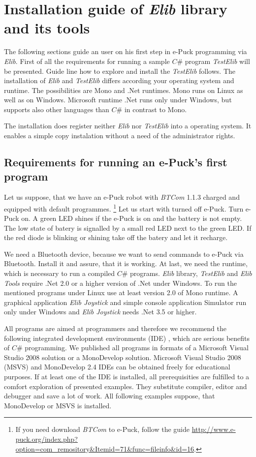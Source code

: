   \chapter{Installation guide of {\it Elib} library and its tools} 
  \label{app:installelib}
    The following sections guide an user on his first step in e-Puck programming via {\it Elib}.
    First of all the requirements for running a sample $C\#$ program {\it TestElib} will be presented.
    Guide line how to explore and install the {\it TestElib} follows.
    The installation of {\it Elib} and {\it TestElib} differs according your operating system and runtime.
    The possibilities are Mono\cite{mono} and .Net runtimes. Mono runs on Linux as well as on Windows. Microsoft runtime .Net
    runs only under Windows, but supports also other languages than $C\#$ in contrast to Mono.

    The installation does register neither {\it Elib} nor {\it TestElib} into a operating system. It enables
    a simple copy instalation without a need of the administrator rights.
  \section{Requirements for running an e-Puck's first program}
  \label{sec:require}
  Let us suppose, that we have an e-Puck robot with {\it BTCom} 1.1.3 charged and equipped with default programmes.
  \footnote{\small{If you need download {\it BTCom} to e-Puck, follow the guide 
  \url{http://www.e-puck.org/index.php?option=com_remository&Itemid=71&func=fileinfo&id=16}.}}
  Let us start with turned off e-Puck. Turn e-Puck on.
  A green LED shines if the e-Puck is on and the battery is not empty.
  The low state of batery is signalled by a small red LED next to the green LED. 
  If the red diode is blinking or shining take off the batery and let it recharge.


  We need a Bluetooth device, because we want to send commands to e-Puck via Bluetooth. Install it and assure,
  that it is working.
  At last, we need the runtime, which is necessary to run a compiled $C\#$ programs. 
  {\it Elib} library, {\it TestElib} and {\it Elib Tools} require .Net 2.0 or a higher version of .Net under Windows.
  To run the mentioned programs under Linux use at least version 2.0 of Mono runtime.
  A graphical application {\it Elib Joystick} and simple console application Simulator
  run only under Windows and {\it Elib Joystick} needs .Net 3.5 or higher.

  All programs are aimed at programmers and therefore we recommend the following integrated development environments (IDE) ,
  which are serious benefits of $C\#$ programming.
  We published all programs in formats of a Microsoft Visual Studio 2008 solution or a MonoDevelop solution.  
  Microsoft Visual Studio 2008 (MSVS) and MonoDevelop 2.4 IDEs can be obtained freely for educational purposes.
  If at least one of the IDE is installed, all prerequisities are fulfilled to a comfort exploration of presented examples. 
  They substitute compiler, editor and debugger and save a lot of work.
  All following examples suppose, that MonoDevelop or MSVS is installed.

